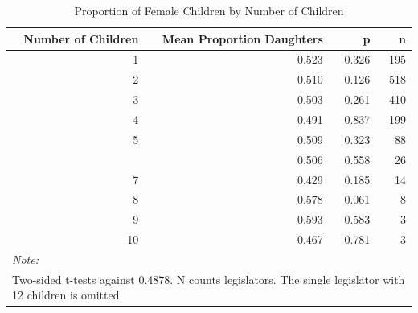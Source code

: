 \begin{table}

\caption{Proportion of Female Children by Number of Children}
\centering
\begin{tabular}[t]{rrrr}
\toprule
Number of Children & Mean Proportion Daughters & p & n\\
\midrule
1 & 0.523 & 0.326 & 195\\
2 & 0.510 & 0.126 & 518\\
3 & 0.503 & 0.261 & 410\\
4 & 0.491 & 0.837 & 199\\
5 & 0.509 & 0.323 & 88\\
\addlinespace
6 & 0.506 & 0.558 & 26\\
7 & 0.429 & 0.185 & 14\\
8 & 0.578 & 0.061 & 8\\
9 & 0.593 & 0.583 & 3\\
10 & 0.467 & 0.781 & 3\\
\bottomrule
\multicolumn{4}{l}{\rule{0pt}{1em}\textit{Note: }}\\
\multicolumn{4}{l}{\rule{0pt}{1em}Two-sided t-tests against 0.4878. N counts legislators. The single legislator with 12 children is omitted.}\\
\end{tabular}
\end{table}
